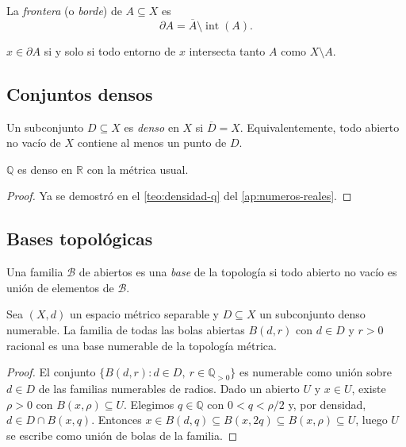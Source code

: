 \begin{definition}
\label{def:frontera}
La \emph{frontera} (o \emph{borde}) de $A\subseteq X$ es
\[
  \partial A=\overline{A}\setminus\operatorname{int}(A).
\]
\end{definition}

\begin{proposition}
\label{prop:frontera-carac}
$x\in\partial A$ si y solo si todo entorno de $x$ intersecta tanto $A$ como $X\setminus A$.
\end{proposition}

\subsection{Conjuntos densos}

\begin{definition}
\label{def:densidad}
Un subconjunto $D\subseteq X$ es \emph{denso} en $X$ si $\overline{D}=X$. Equivalentemente, todo abierto no vacío de $X$ contiene al menos un punto de $D$.
\end{definition}

\begin{theorem}
\label{teo:q-denso-r}
$\mathbb{Q}$ es denso en $\mathbb{R}$ con la métrica usual.
\end{theorem}
\begin{proof}
Ya se demostró en el \cref{teo:densidad-q} del \cref{ap:numeros-reales}.
\end{proof}

\subsection{Bases topológicas}

\begin{definition}
\label{def:base}
Una familia $\mathcal{B}$ de abiertos es una \emph{base} de la topología si todo abierto no vacío es unión de elementos de $\mathcal{B}$.
\end{definition}

\begin{theorem}
\label{teo:base-metrica}
Sea $(X,d)$ un espacio métrico separable y $D\subseteq X$ un subconjunto denso numerable. La familia de todas las bolas abiertas $B(d,r)$ con $d\in D$ y $r>0$ racional es una base numerable de la topología métrica.
\end{theorem}

\begin{proof}
El conjunto $\{B(d,r):d\in D,\ r\in\mathbb{Q}_{>0}\}$ es numerable como unión sobre $d\in D$ de las familias numerables de radios. Dado un abierto $U$ y $x\in U$, existe $\rho>0$ con $B(x,\rho)\subseteq U$. Elegimos $q\in\mathbb{Q}$ con $0<q<\rho/2$ y, por densidad, $d\in D\cap B(x,q)$. Entonces $x\in B(d,q)\subseteq B(x,2q)\subseteq B(x,\rho)\subseteq U$, luego $U$ se escribe como unión de bolas de la familia.
\end{proof}

